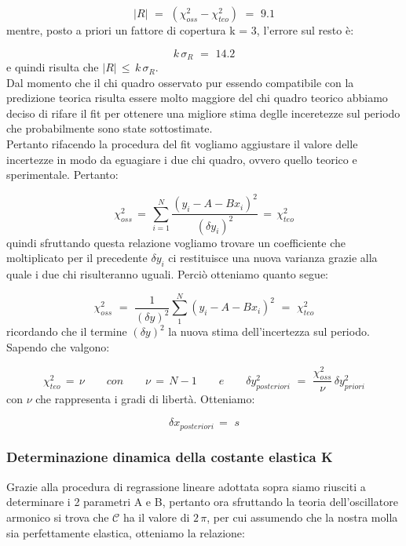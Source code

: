 \begin{equation*}
	|R| \,\,=\,\, (\chi_{oss}^2 - \chi_{teo}^2) \,\,=\,\, 9.1
\end{equation*}
%
mentre, posto a priori un fattore di copertura k = 3, l'errore sul resto è:

\begin{equation*}
	k \, \sigma_{R} \,\,=\,\, 14.2
\end{equation*}
%
e quindi risulta che $|R| \, \leq \, k \, \sigma_{R}$.\\

Dal momento che il chi quadro osservato pur essendo compatibile con la predizione teorica risulta essere molto maggiore del chi quadro teorico abbiamo deciso di rifare il fit per ottenere una migliore stima deglle inceretezze sul periodo che probabilmente sono state sottostimate.\\
Pertanto rifacendo la procedura del fit vogliamo aggiustare il valore delle incertezze in modo da eguagiare i due chi quadro, ovvero quello teorico e sperimentale. Pertanto:

\begin{equation*}
	\chi_{oss}^2 \,=\, \sum_{i=1}^{N} \frac{(y_i - A - Bx_i)^2}{(\delta y_i)^2} \,=\, \chi_{teo}^2 
\end{equation*}
%
quindi sfruttando questa relazione vogliamo trovare un coefficiente che moltiplicato per il precedente $\delta y_i$ ci restituisce una nuova varianza grazie alla quale i due chi risulteranno uguali. Perciò otteniamo quanto segue:
	
\begin{equation*}
	\chi_{oss}^2 \,\,=\,\, \frac{1}{(\delta y)^2} \sum_{1}^{N} (y_i - A - Bx_i)^2  \,\,=\,\, \chi_{teo}^2
\end{equation*}
%
ricordando che il termine $(\delta y)^2$ la nuova stima dell'incertezza sul periodo. Sapendo che valgono:
	
\begin{equation*}
	\chi_{teo}^2 \,=\, \nu \quad \quad con \quad \quad
	\nu \,=\, N - 1 \quad \quad e \quad \quad
	\delta y_{posteriori}^2 \,\,=\,\, \frac{\chi_{oss}^2}{\nu} \, \delta y_{priori}^2
\end{equation*}
%
con $\nu$ che rappresenta i gradi di libertà. Otteniamo:

\begin{equation*}
	\delta x_{posteriori} \,=\,  \,s
\end{equation*}	 

\subsubsection{Determinazione dinamica della costante elastica K}
Grazie alla procedura di regrassione lineare adottata sopra siamo riusciti a determinare i 2 parametri A e B, pertanto ora sfruttando la teoria dell'oscillatore armonico si trova che $\mathcal{C}$ ha il valore di $2 \, \pi$, per cui assumendo che la nostra molla sia perfettamente elastica, otteniamo la relazione:

